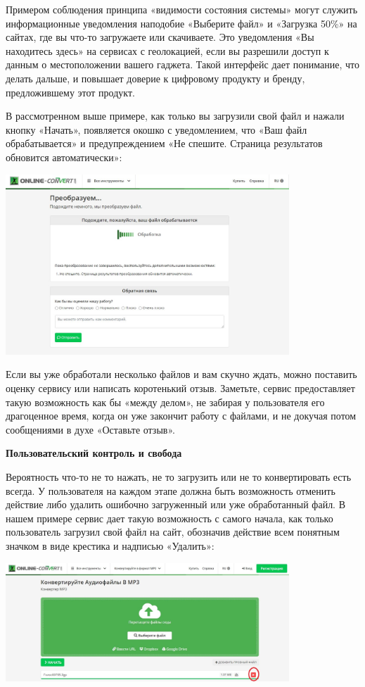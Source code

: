 Примером соблюдения принципа «видимости состояния системы» могут служить информационные уведомления наподобие «Выберите файл» и «Загрузка 50\%» на сайтах, где вы что-то загружаете или скачиваете. Это уведомления «Вы находитесь здесь» на сервисах с геолокацией, если вы разрешили доступ к данным о местоположении вашего гаджета. Такой интерфейс дает понимание, что делать дальше, и повышает доверие к цифровому продукту и бренду, предложившему этот продукт.

В рассмотренном выше примере, как только вы загрузили свой файл и нажали кнопку «Начать», появляется окошко с уведомлением, что «Ваш файл обрабатывается» и предупреждением «Не спешите. Страница результатов обновится автоматически»:

\begin{center}
    \includegraphics[width=0.8\textwidth]{img/cxp4.jpg}
\end{center}

Если вы уже обработали несколько файлов и вам скучно ждать, можно поставить оценку сервису или написать коротенький отзыв. Заметьте, сервис предоставляет такую возможность как бы «между делом», не забирая у пользователя его драгоценное время, когда он уже закончит работу с файлами, и не докучая потом сообщениями в духе «Оставьте отзыв».

\textbf{Пользовательский контроль и свобода}

Вероятность что-то не то нажать, не то загрузить или не то конвертировать есть всегда. У пользователя на каждом этапе должна быть возможность отменить действие либо удалить ошибочно загруженный или уже обработанный файл. В нашем примере сервис дает такую возможность с самого начала, как только пользователь загрузил свой файл на сайт, обозначив действие всем понятным значком в виде крестика и надписью «Удалить»:

\begin{center}
    \includegraphics[width=0.8\textwidth]{img/cxp5.jpg}
\end{center}

